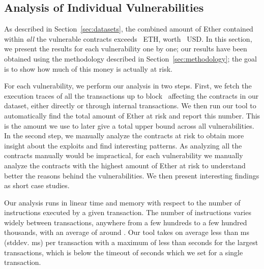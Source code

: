 


\subsection{Analysis of Individual Vulnerabilities}
\label{sec:analysis}

As described in Section~\ref{sec:datasets}, the combined amount of Ether contained within \emph{all} the vulnerable contracts exceeds~ ETH, worth~ USD. In this section, we present the results for each vulnerability one by one; our results have been obtained using the methodology described in Section~\ref{sec:methodology}; the goal is to show how much of this money is actually at risk.

For each vulnerability, we perform our analysis in two steps.
First, we fetch the execution traces of all the transactions up to block~ affecting the contracts in our dataset, either directly or through internal transactions. We then run our tool to automatically find the total amount of Ether at risk and report this number.
This is the amount we use to later give a total upper bound across all vulnerabilities.
In the second step, we manually analyze the contracts at risk to obtain more insight about the exploits and find interesting patterns.
As analyzing all the contracts manually would be impractical, for each vulnerability we manually analyze the contracts with the highest amount of Ether at risk to understand better the reasons behind the vulnerabilities.
We then present interesting findings as short case studies.

 Our analysis runs in linear time and memory with respect to the number of instructions executed by a given transaction. The number of instructions varies widely between transactions, anywhere from a few hundreds to a few hundred thousands, with an average of around . Our tool takes on average less than ms (stddev. ms) per transaction with a maximum of less than  seconds for the largest transactions, which is below the timeout of  seconds which we set for a single transaction.


